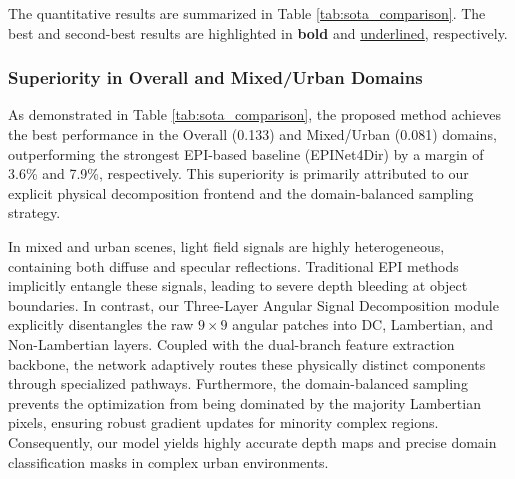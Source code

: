 \documentclass[lettersize,journal]{IEEEtran}
\begin{document}
The quantitative results are summarized in Table \ref{tab:sota_comparison}. The best and second-best results are highlighted in \textbf{bold} and \underline{underlined}, respectively.

\begin{table}[!t]
\caption{Quantitative Comparison with State-of-the-Art Light Field Depth Estimation Methods}\label{tab:sota_comparison}
\centering\small
{}
\end{table}

\subsubsection{Superiority in Overall and Mixed/Urban Domains}
As demonstrated in Table \ref{tab:sota_comparison}, the proposed method achieves the best performance in the Overall (0.133) and Mixed/Urban (0.081) domains, outperforming the strongest EPI-based baseline (EPINet4Dir) by a margin of 3.6\% and 7.9\%, respectively. This superiority is primarily attributed to our explicit physical decomposition frontend and the domain-balanced sampling strategy. 

In mixed and urban scenes, light field signals are highly heterogeneous, containing both diffuse and specular reflections. Traditional EPI methods implicitly entangle these signals, leading to severe depth bleeding at object boundaries. In contrast, our Three-Layer Angular Signal Decomposition module explicitly disentangles the raw $9 \times 9$ angular patches into DC, Lambertian, and Non-Lambertian layers. Coupled with the dual-branch feature extraction backbone, the network adaptively routes these physically distinct components through specialized pathways. Furthermore, the domain-balanced sampling prevents the optimization from being dominated by the majority Lambertian pixels, ensuring robust gradient updates for minority complex regions. Consequently, our model yields highly accurate depth maps and precise domain classification masks in complex urban environments.
\end{document}
